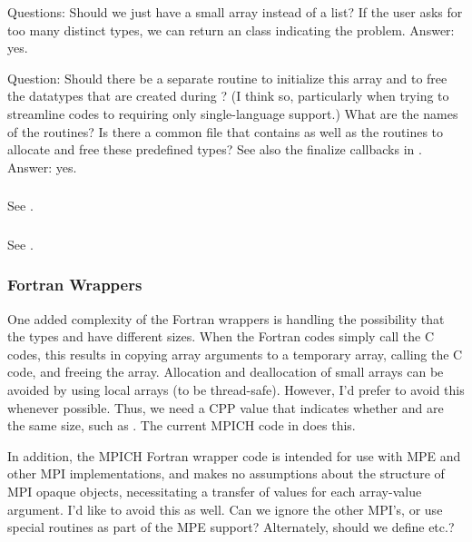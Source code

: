 \documentclass{article}
\begin{document}
Questions:
Should we just have a small array instead of a list?  If the user asks for too
many distinct types, we can return an  class
indicating the problem.  Answer: yes.

Question:
Should there be a separate routine to initialize this array and to free the
datatypes that are created during ?  (I think so,
particularly when trying to streamline codes to requiring only single-language
support.)  What are the names of the routines?  Is there a common file that
contains  as well as the routines to
allocate and free these predefined types?  See also the finalize
callbacks in .  Answer: yes.

\subsubsection{}
See .

\subsubsection{}
See .

\subsubsection{Fortran Wrappers}
One added complexity of the Fortran wrappers is handling the possibility that
the types  and  have different sizes.  When the
Fortran codes simply call the C codes, this results in copying array arguments
to a temporary array, calling the C code, and freeing the array.  Allocation
and deallocation of small arrays can be avoided by using local arrays (to be
thread-safe).  However, I'd prefer to avoid this whenever possible.  Thus, we
need a CPP value that indicates whether  and  are the
same size, such as .  The current MPICH code in
 does this.

In addition, the MPICH Fortran wrapper code is intended for use with MPE and
other MPI implementations, and makes no assumptions about the structure of
MPI opaque objects, necessitating a transfer of values for each array-value
argument.  I'd like to avoid this as well.  Can we ignore the other MPI's, or
use special routines as part of the MPE support?  Alternately, should we
define  etc.?
\end{document}
